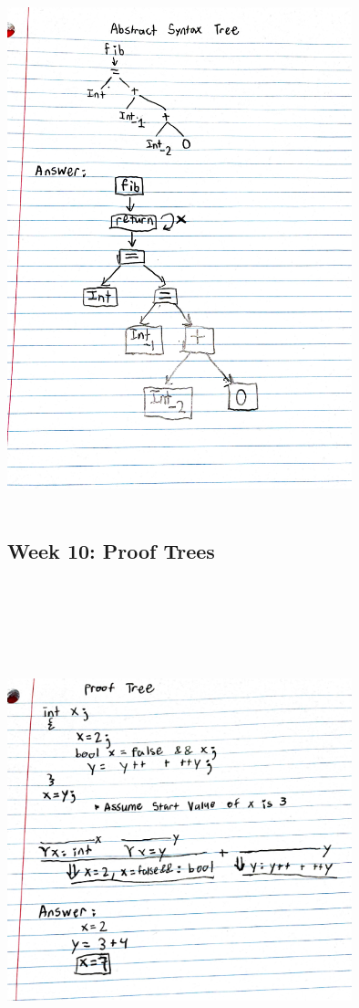 \documentclass{article}
\theoremstyle{theorem}
\theoremstyle{definition}
\theoremstyle{remark}
\begin{document}
\medskip\begin{center}
\includegraphics[width=10cm, height=15cm]{Week4Q2.pdf}
\end{center}

\subsection{Week 10: Proof Trees}
\medskip\begin{center}
\includegraphics[width=10cm, height=15cm]{Week10.pdf}
\end{center}
\end{document}
